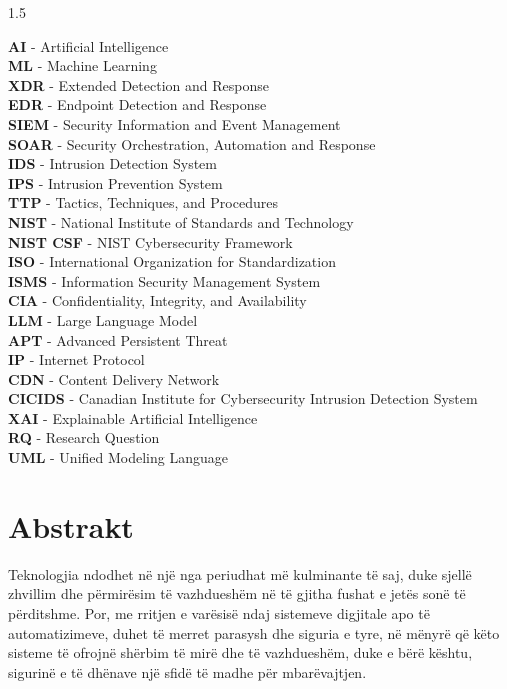 \documentclass[12pt,a4paper]{report}
\begin{document}
\begin{spacing}{1.5}
\begin{flushleft}
\textbf{AI} - Artificial Intelligence\\
\textbf{ML} - Machine Learning\\
\textbf{XDR} - Extended Detection and Response\\
\textbf{EDR} - Endpoint Detection and Response\\
\textbf{SIEM} - Security Information and Event Management\\
\textbf{SOAR} - Security Orchestration, Automation and Response\\
\textbf{IDS} - Intrusion Detection System\\
\textbf{IPS} - Intrusion Prevention System\\
\textbf{TTP} - Tactics, Techniques, and Procedures\\
\textbf{NIST} - National Institute of Standards and Technology\\
\textbf{NIST CSF} - NIST Cybersecurity Framework\\
\textbf{ISO} - International Organization for Standardization\\
\textbf{ISMS} - Information Security Management System\\
\textbf{CIA} - Confidentiality, Integrity, and Availability\\
\textbf{LLM} - Large Language Model\\
\textbf{APT} - Advanced Persistent Threat\\
\textbf{IP} - Internet Protocol\\
\textbf{CDN} - Content Delivery Network\\
\textbf{CICIDS} - Canadian Institute for Cybersecurity Intrusion Detection System\\
\textbf{XAI} - Explainable Artificial Intelligence\\
\textbf{RQ} - Research Question\\
\textbf{UML} - Unified Modeling Language
\end{flushleft}
\end{spacing}


\chapter*{Abstrakt}

Teknologjia ndodhet në një nga periudhat më kulminante të saj, duke sjellë zhvillim dhe
përmirësim të vazhdueshëm në të gjitha fushat e jetës sonë të përditshme. Por, me rritjen e
varësisë ndaj sistemeve digjitale apo të automatizimeve, duhet të merret parasysh dhe siguria e
tyre, në mënyrë që këto sisteme të ofrojnë shërbim të mirë dhe të vazhdueshëm, duke e bërë
kështu, sigurinë e të dhënave një sfidë të madhe për mbarëvajtjen.
\end{document}
